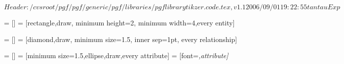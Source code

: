 \ProvidesPackageRCS[v\pgfversion] $Header: /cvsroot/pgf/pgf/generic/pgf/libraries/pgflibrarytikzer.code.tex,v 1.1 2006/09/01 19:22:55 tantau Exp $

%




=           []
=                 [rectangle,draw,
                                     minimum height=2\baselineskip,
                                     minimum width=4\baselineskip,every entity]



=     []
=           [diamond,draw,
                                     minimum size=1.5\baselineskip,
                                     inner sep=1pt,
                                     every relationship]



=        []
=              [minimum size=1.5\baselineskip,ellipse,draw,every attribute]
=          [font=\itshape,attribute]




\endinput
